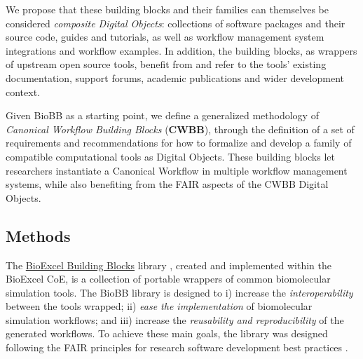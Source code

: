 We propose that these building blocks and their families can themselves
be considered \emph{composite Digital Objects}: collections of software
packages and their source code, guides and tutorials, as well as
workflow management system integrations and workflow examples. In
addition, the building blocks, as wrappers of upstream open source
tools, benefit from and refer to the tools' existing documentation,
support forums, academic publications and wider development context.

Given BioBB as a starting point, we define a generalized methodology of
\emph{Canonical Workflow Building Blocks} (\textbf{CWBB}), through the
definition of a set of requirements and recommendations for how to
formalize and develop a family of compatible computational tools as
Digital Objects. These building blocks let researchers instantiate a
Canonical Workflow in multiple workflow management systems, while also
benefiting from the FAIR aspects of the CWBB Digital Objects.

\hypertarget{methods}{%
\subsection{Methods}\label{methods}}

The \href{http://mmb.irbbarcelona.org/biobb/}{BioExcel Building Blocks}
library \cite{ch6-10}, created and implemented within the BioExcel CoE, is a
collection of portable wrappers of common biomolecular simulation tools.
The BioBB library is designed to i) increase the \emph{interoperability}
between the tools wrapped; ii) \emph{ease the implementation} of
biomolecular simulation workflows; and iii) increase the
\emph{reusability and reproducibility} of the generated workflows. To
achieve these main goals, the library was designed following the FAIR
principles for research software development best practices \cite{Lamprecht 2019}.

